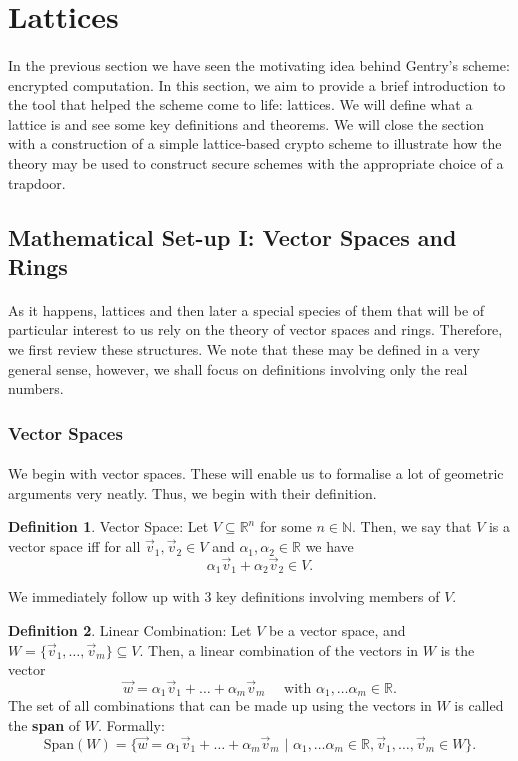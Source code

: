 \documentclass{article}
\theoremstyle{definition}
\newtheorem{definition}{Definition}[section]
\theoremstyle{example}
\newcommand{\Nat}{\mathbb{N}}
\newcommand{\Reals}{\mathbb{R}}
\newcommand{\Span}{\text{Span}}
\begin{document}
\section{Lattices}
\paragraph{}
In the previous section we have seen the motivating idea behind Gentry's scheme:
encrypted computation. In this section, we aim to provide a brief introduction
to the tool that helped the scheme come to life: lattices. We will define what a
lattice is and see some key definitions and theorems. We will close the section
with a construction of a simple lattice-based crypto scheme to illustrate how
the theory may be used to construct secure schemes with the appropriate choice
of a trapdoor. \cite{hoffstein2014introduction}
\subsection{Mathematical Set-up I: Vector Spaces and Rings}
\paragraph{} As it happens, lattices and then later a special species of them
that will be of particular interest to us rely on the theory of vector
spaces and rings. Therefore, we first review these structures. We note that
these may be defined in a very general sense, however, we shall focus on
definitions involving only the real numbers.
\subsubsection{Vector Spaces}
\paragraph{} We begin with vector spaces. These will enable us to formalise a
lot of geometric arguments very neatly. Thus, we begin with their definition.
\begin{definition}{Vector Space:}
  Let $V \subseteq \Reals^n$ for some $n \in \Nat$. Then, we say that $V$ is a
  vector space iff for all $\vec{v}_1, \vec{v}_2 \in V$ and $\alpha_1, \alpha_2
  \in \Reals$ we have
  \[
    \alpha_1\vec{v}_1 + \alpha_2\vec{v}_2 \in V.
  \]
\end{definition}
We immediately follow up with 3 key definitions involving members of $V$.
\begin{definition}{Linear Combination:}
  Let $V$ be a vector space, and $W = \{\vec{v}_1, \hdots, \vec{v}_m\} \subseteq
  V$. Then, a linear combination of the vectors in $W$ is the vector
  \[
    \vec{w} = \alpha_1\vec{v}_1 + \hdots + \alpha_m\vec{v}_m\quad\text{ with }
    \alpha_1, \hdots \alpha_m \in \Reals.
  \]
  The set of all combinations that can be made up using the vectors in $W$ is
  called the \textbf{span} of $W$. Formally:
  \[
    \Span(W) = \{\vec{w} = \alpha_1\vec{v}_1 + \hdots + \alpha_m\vec{v}_m
    \,\,|\,\, \alpha_1, \hdots \alpha_m \in \Reals, \vec{v}_1,\hdots, \vec{v}_m
    \in W \}.
  \]
\end{definition}
\end{document}

